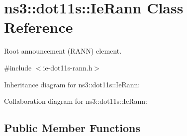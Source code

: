 \hypertarget{classns3_1_1dot11s_1_1IeRann}{}\section{ns3\+:\+:dot11s\+:\+:Ie\+Rann Class Reference}
\label{classns3_1_1dot11s_1_1IeRann}


Root announcement (R\+A\+NN) element.  




{\ttfamily \#include $<$ie-\/dot11s-\/rann.\+h$>$}



Inheritance diagram for ns3\+:\+:dot11s\+:\+:Ie\+Rann\+:


Collaboration diagram for ns3\+:\+:dot11s\+:\+:Ie\+Rann\+:
\subsection*{Public Member Functions}
